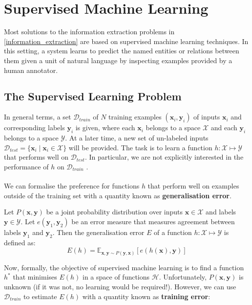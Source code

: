 \section{Supervised Machine Learning}
\label{supervised_machine_learning}

Most solutions to the information extraction problems in \ref{information_extraction} are based on supervised machine learning techniques. In this setting, a system learns to predict the named entities or relations between them given a unit of natural language by inspecting examples provided by a human annotator.

\subsection{The Supervised Learning Problem}
\label{the_supervised_learning_problem}
In general terms, a set $\mathcal{D}_{train}$ of $N$ training examples $(\mathbf{x}_i, \mathbf{y}_i)$ of inputs $\mathbf{x}_i$ and corresponding labels $\mathbf{y}_i$ is given, where each $\mathbf{x}_i$ belongs to a space $\mathcal{X}$ and each $\mathbf{y}_i$ belongs to a space $\mathcal{Y}$. At a later time, a new set of un-labeled inputs $\mathcal{D}_{test} = \{ \mathbf{x}_i \mid \mathbf{x}_i \in \mathcal{X}\}$ will be provided. The task is to learn a function $h: \mathcal{X} \mapsto \mathcal{Y}$ that performs well on $\mathcal{D}_{test}$. In particular, we are not explicitly interested in the performance of $h$ on $\mathcal{D}_{train}$ \citep{yaser12}.
\\\\
We can formalise the preference for functions $h$ that perform well on examples outside of the training set with a quantity known as \textbf{generalisation error}.

\begin{definition}
	Let $P(\mathbf{x}, \mathbf{y})$ be a joint probability distribution over inputs $\mathbf{x} \in \mathcal{X}$ and labels $\mathbf{y} \in \mathcal{Y}$. Let $e(\mathbf{y}_1, \mathbf{y}_2)$ be an error measure that measures agreement between labels $\mathbf{y}_1$ and $\mathbf{y}_2$. Then the generalisation error $E$ of a function $h: \mathcal{X} \mapsto \mathcal{Y}$ is defined as:
	$$
		E(h) = \mathbb{E}_{\mathbf{x},\mathbf{y}\sim P(\mathbf{y}, \mathbf{x})}[e(h(\mathbf{x}), \mathbf{y})]
	$$
\end{definition}
Now, formally, the objective of supervised machine learning is to find a function $h^*$ that minimises $E(h)$ in a space of functions $\mathcal{H}$. Unfortunately, $P(\mathbf{x}, \mathbf{y})$ is unknown (if it was not, no learning would be required!). However, we can use $\mathcal{D}_{train}$ to estimate $E(h)$ with a quantity known as \textbf{training error}:

